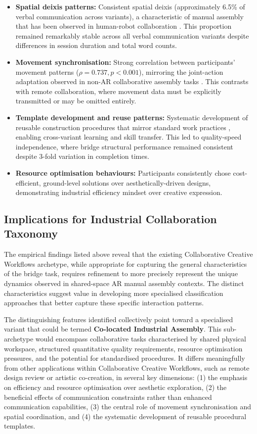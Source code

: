 \begin{itemize}
    \item \textbf{Spatial deixis patterns:} Consistent spatial deixis (approximately 6.5\% of verbal communication across variants), a characteristic of manual assembly that has been observed in human-robot collaboration \cite{sauppe2014robot}. This proportion remained remarkably stable across all verbal communication variants despite differences in session duration and total word counts.
    \item \textbf{Movement synchronisation:} Strong correlation between participants' movement patterns ($\rho = 0.737, p < 0.001$), mirroring the joint-action adaptation observed in non-AR collaborative assembly tasks \cite{sebanz2006joint}. This contrasts with remote collaboration, where movement data must be explicitly transmitted or may be omitted entirely.
    \item \textbf{Template development and reuse patterns:} Systematic development of reusable construction procedures that mirror standard work practices \cite{kamrani2006methodology}, enabling cross-variant learning and skill transfer. This led to quality-speed independence, where bridge structural performance remained consistent despite 3-fold variation in completion times.
    \item \textbf{Resource optimisation behaviours:} Participants consistently chose cost-efficient, ground-level solutions over aesthetically-driven designs, demonstrating industrial efficiency mindset over creative expression.
\end{itemize}

\subsection{Implications for Industrial Collaboration Taxonomy}
The empirical findings listed above reveal that the existing Collaborative Creative Workflows archetype, while appropriate for capturing the general characteristics of the bridge task, requires refinement to more precisely represent the unique dynamics observed in shared-space AR manual assembly contexts. The distinct characteristics suggest value in developing more specialised classification approaches that better capture these specific interaction patterns.

The distinguishing features identified collectively point toward a specialised variant that could be termed \textbf{Co-located Industrial Assembly}. This sub-archetype would encompass collaborative tasks characterised by shared physical workspace, structured quantitative quality requirements, resource optimisation pressures, and the potential for standardised procedures. It differs meaningfully from other applications within Collaborative Creative Workflows, such as remote design review or artistic co-creation, in several key dimensions: (1) the emphasis on efficiency and resource optimisation over aesthetic exploration, (2) the beneficial effects of communication constraints rather than enhanced communication capabilities, (3) the central role of movement synchronisation and spatial coordination, and (4) the systematic development of reusable procedural templates.

